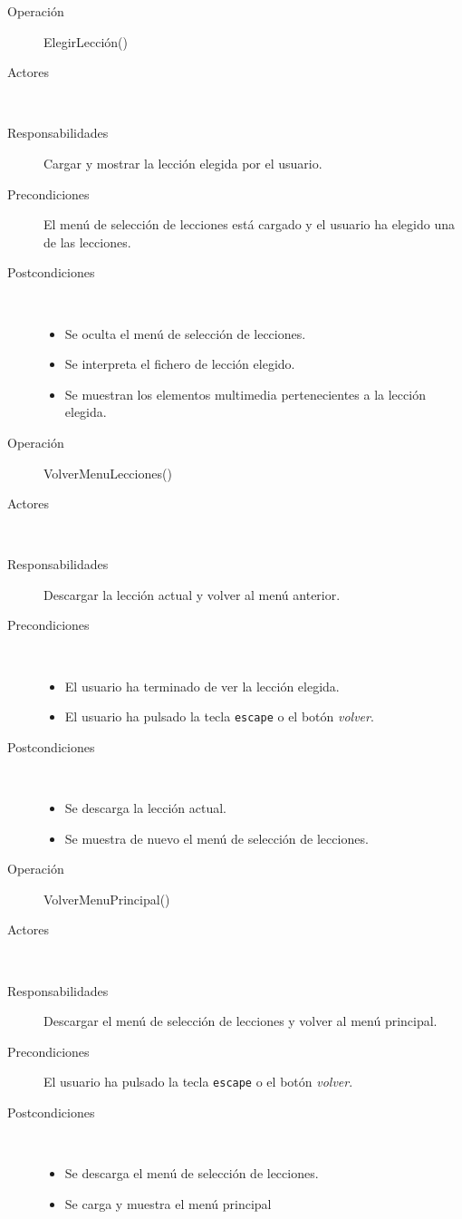 \begin{description}
\item[Operación] ElegirLección()
\item[Actores] \jugador\, \sistema\
\item[Responsabilidades] Cargar y mostrar la lección elegida por el usuario.
\item[Precondiciones] El menú de selección de lecciones está cargado y el
  usuario ha elegido una de las lecciones.
\item[Postcondiciones]$\quad$
  \begin{itemize}
  \item Se oculta el menú de selección de lecciones.
  \item Se interpreta el fichero de lección elegido.
  \item Se muestran los elementos multimedia pertenecientes a la lección
    elegida.
  \end{itemize}
\end{description}

\begin{description}
\item[Operación] VolverMenuLecciones()
\item[Actores] \jugador\, \sistema\
\item[Responsabilidades] Descargar la lección actual y volver al menú anterior.
\item[Precondiciones] $\quad$
  \begin{itemize}
  \item El usuario ha terminado de ver la lección elegida.
  \item El usuario ha pulsado la tecla \texttt{escape} o el botón \textit{volver}.
  \end{itemize}
\item[Postcondiciones] $\quad$
  \begin{itemize}
  \item Se descarga la lección actual.
  \item Se muestra de nuevo el menú de selección de lecciones.
  \end{itemize}
\end{description}

\begin{description}
\item[Operación] VolverMenuPrincipal()
\item[Actores] \jugador\, \sistema\
\item[Responsabilidades] Descargar el menú de selección de lecciones y volver al
  menú principal.
\item[Precondiciones] El usuario ha pulsado la tecla \texttt{escape} o el botón \textit{volver}.
\item[Postcondiciones] $\quad$
  \begin{itemize}
  \item Se descarga el menú de selección de lecciones.
  \item Se carga y muestra el menú principal
  \end{itemize}
\end{description}



